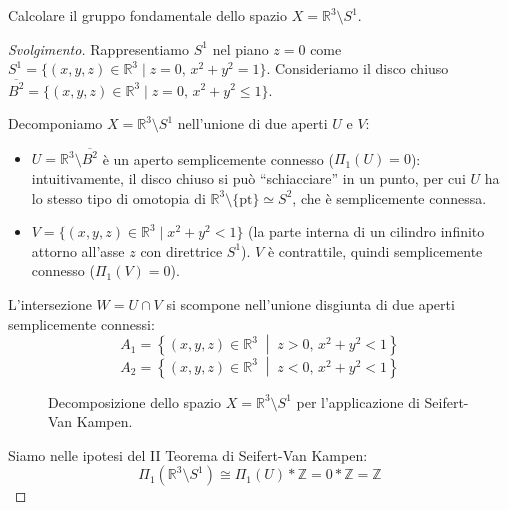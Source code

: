 \begin{ejercicio*}
Calcolare il gruppo fondamentale dello spazio $X = \mathbb{R}^3 \setminus S^1$.

\begin{proof}[Svolgimento]
Rappresentiamo $S^1$ nel piano $z=0$ come $S^1 = \{(x,y,z) \in \mathbb{R}^3 \mid z=0, \, x^2+y^2=1\}$.
Consideriamo il disco chiuso $\overline{B^2} = \{(x,y,z) \in \mathbb{R}^3 \mid z=0, \, x^2+y^2 \leqslant 1\}$.

Decomponiamo $X = \mathbb{R}^3 \setminus S^1$ nell'unione di due aperti $U$ e $V$:
\begin{itemize}
    \item $U = \mathbb{R}^3 \setminus \overline{B^2}$ è un aperto semplicemente connesso ($\Pi_1(U) = 0$): intuitivamente, il disco chiuso si pu\`o ``schiacciare'' in un punto, per cui $U$ ha lo stesso tipo di omotopia di $\mathbb{R}^3 \setminus \{\text{pt}\} \simeq S^2$, che \`e semplicemente connessa.
    \item $V = \{(x,y,z) \in \mathbb{R}^3 \mid x^2+y^2 < 1\}$ (la parte interna di un cilindro infinito attorno all'asse $z$ con direttrice $S^1$). $V$ è contrattile, quindi semplicemente connesso ($\Pi_1(V) = 0$).
\end{itemize}

L'intersezione $W = U \cap V$ si scompone nell'unione disgiunta di due aperti semplicemente connessi:
\[
A_1 = \left\{(x,y,z) \in \mathbb{R}^3 \;\middle|\; z > 0, \, x^2+y^2 < 1\right\}
\]
\[
A_2 = \left\{(x,y,z) \in \mathbb{R}^3 \;\middle|\; z < 0, \, x^2+y^2 < 1\right\}
\]

\begin{figure}[H]
    \centering
    \caption{Decomposizione dello spazio $X = \mathbb{R}^3 \setminus S^1$ per l'applicazione di Seifert-Van Kampen.}
\end{figure}

Siamo nelle ipotesi del II Teorema di Seifert-Van Kampen:
\[
\Pi_1(\mathbb{R}^3 \setminus S^1) \cong \Pi_1(U) * \mathbb{Z} = 0 * \mathbb{Z} = \mathbb{Z}
\]
\end{proof}
\end{ejercicio*}

